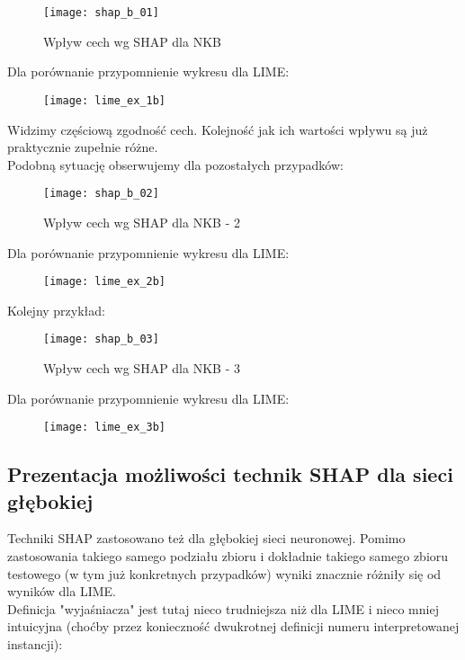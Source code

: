 \begin{figure}[H]
    \centering
    \texttt{[image: shap\_b\_01]}
    \caption{Wpływ cech wg SHAP dla NKB}
    \label{fig:shap_b_01}
\end{figure}
Dla porównanie przypomnienie wykresu dla LIME:

\begin{figure}[H]
    \centering
    \texttt{[image: lime\_ex\_1b]}
\end{figure}

Widzimy częściową zgodność cech. Kolejność jak ich wartości wpływu są już praktycznie zupełnie różne.\\

Podobną sytuację obserwujemy dla pozostałych przypadków:
\begin{figure}[H]
    \centering
    \texttt{[image: shap\_b\_02]}
    \caption{Wpływ cech wg SHAP dla NKB - 2}
    \label{fig:shap_b_02}
\end{figure}
Dla porównanie przypomnienie wykresu dla LIME:

\begin{figure}[H]
    \centering
    \texttt{[image: lime\_ex\_2b]}
\end{figure}

Kolejny przykład:
\begin{figure}[H]
    \centering
    \texttt{[image: shap\_b\_03]}
    \caption{Wpływ cech wg SHAP dla NKB - 3}
    \label{fig:shap_b_03}
\end{figure}
Dla porównanie przypomnienie wykresu dla LIME:

\begin{figure}[H]
    \centering
    \texttt{[image: lime\_ex\_3b]}
\end{figure}


\subsection{Prezentacja możliwości technik SHAP dla sieci głębokiej}
Techniki SHAP zastosowano też dla głębokiej sieci neuronowej. Pomimo zastosowania takiego samego podziału zbioru i dokładnie takiego samego zbioru testowego (w tym już konkretnych przypadków) wyniki znacznie różniły się od wyników dla LIME.\\

Definicja "wyjaśniacza" jest tutaj nieco trudniejsza niż dla LIME i nieco mniej intuicyjna (choćby przez konieczność dwukrotnej definicji numeru interpretowanej instancji):

